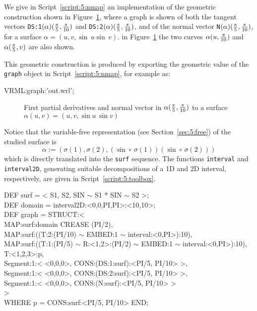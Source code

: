 \documentclass{31x47jw}
\begin{document}
\begin{example}
    
We give in Script~\ref{script:5:nmap} an implementation of the
geometric construction shown in Figure~\ref{fig:5:normal}, where a
graph is shown of both the tangent vectors
\texttt{DS:1}$(\alpha)({\pi\over 5}, {\pi\over 10})$ and
\texttt{DS:2}$(\alpha)({\pi\over 5}, {\pi\over 10})$, and of the
normal vector \texttt{N}$(\alpha)({\pi\over 5}, {\pi\over 10})$, for a
surface $\alpha = (u, v, \sin\, u\sin\, v)$.  in Figure~\ref{fig:5:normal} the
two curves $\alpha(u,{\pi\over 10})$ and $\alpha({\pi\over 5}, v)$ are
also shown.  

This geometric construction is produced by exporting the geometric
value of the \texttt{graph} object in Script~\ref{script:5:nmap}, for
example as:
\begin{smallplasm}
VRML:graph:$'$out.wrl$'$;
\end{smallplasm}


\begin{figure}[h]
\centering{}
\caption{First partial derivatives and normal vector in $\alpha({\pi\over
5}, {\pi\over 10})$ to a surface $\alpha(u,v)=(u,v,\sin u\, \sin v)$
\label{fig:5:normal}}
\end{figure}


Notice that the variable-free representation (see
Section~\ref{sec:5:free}) of the studied surface is
\[
\alpha := ( \sigma(1), \sigma(2), 
(\sin\circ\,\sigma(1))(\sin\circ\,\sigma(2)) )
\]
which is directly translated into the \texttt{surf} sequence.  The
functions \texttt{interval} and \texttt{interval2D}, generating suitable
decompositions of a 1D and 2D interval, respectively, are given in
Script~\ref{script:5:toolbox}.

\begin{script}
\begin{smallplasm}
DEF surf = < S1, S2, SIN $\sim$ S1 * SIN $\sim$ S2 >;\\
DEF domain  = interval2D:<0,0,PI,PI>:<10,10>;\\[0.3cm]

DEF graph = STRUCT:< \+\\
  MAP:surf:domain CREASE (PI/2),\\
  MAP:surf:((T:2:(PI/10)  $\sim$  EMBED:1  $\sim$  interval:<0,PI>):10),\\
  MAP:surf:((T:1:(PI/5)  $\sim$  R:<1,2>:(PI/2)  $\sim$  EMBED:1  $\sim$  
  interval:<0,PI>):10),\\
  T:<1,2,3>:p,\\
  Segment:1:< <0,0,0>, CONS:(DS:1:surf):<PI/5, PI/10> >,\\
  Segment:1:< <0,0,0>, CONS:(DS:2:surf):<PI/5, PI/10> >,\\
  Segment:1:< <0,0,0>, CONS:(N:surf):<PI/5, PI/10> >\-\\
> \\
WHERE p = CONS:surf:<PI/5, PI/10> END;
\end{smallplasm}
\label{script:5:nmap}
\end{script}

\label{ex:5:nmap}
\end{example}
\end{document}
